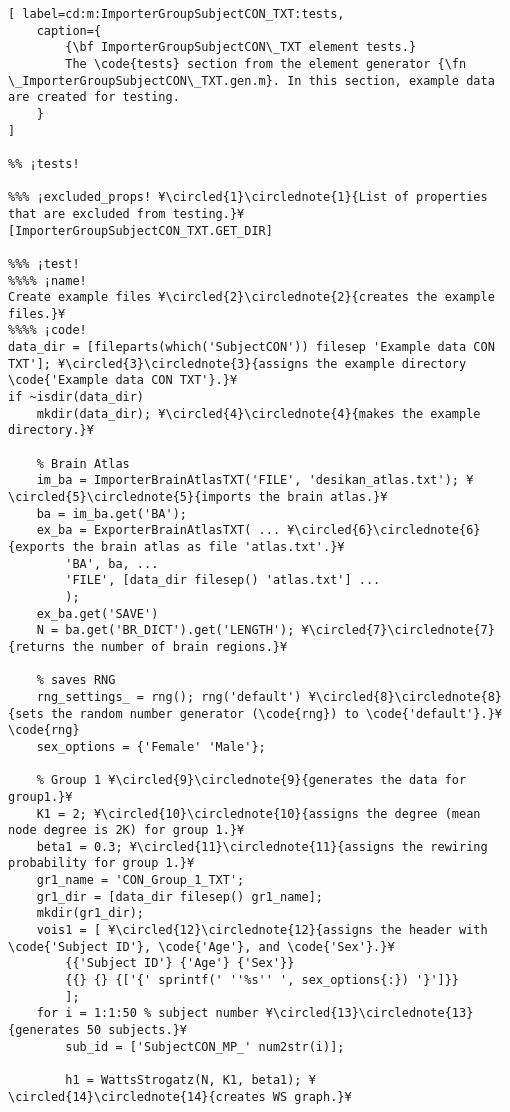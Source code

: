 \documentclass{tufte-handout}
\begin{document}
\begin{lstlisting}[	label=cd:m:ImporterGroupSubjectCON_TXT:tests,
	caption={
		{\bf ImporterGroupSubjectCON\_TXT element tests.}
		The \code{tests} section from the element generator {\fn \_ImporterGroupSubjectCON\_TXT.gen.m}. In this section, example data are created for testing.
	}
]

%% ¡tests!

%%% ¡excluded_props! ¥\circled{1}\circlednote{1}{List of properties that are excluded from testing.}¥
[ImporterGroupSubjectCON_TXT.GET_DIR]

%%% ¡test!
%%%% ¡name!
Create example files ¥\circled{2}\circlednote{2}{creates the example files.}¥
%%%% ¡code!
data_dir = [fileparts(which('SubjectCON')) filesep 'Example data CON TXT']; ¥\circled{3}\circlednote{3}{assigns the example directory \code{'Example data CON TXT'}.}¥
if ~isdir(data_dir)
    mkdir(data_dir); ¥\circled{4}\circlednote{4}{makes the example directory.}¥

    % Brain Atlas
    im_ba = ImporterBrainAtlasTXT('FILE', 'desikan_atlas.txt'); ¥\circled{5}\circlednote{5}{imports the brain atlas.}¥
    ba = im_ba.get('BA');
    ex_ba = ExporterBrainAtlasTXT( ... ¥\circled{6}\circlednote{6}{exports the brain atlas as file 'atlas.txt'.}¥
        'BA', ba, ...
        'FILE', [data_dir filesep() 'atlas.txt'] ...
        );
    ex_ba.get('SAVE')
    N = ba.get('BR_DICT').get('LENGTH'); ¥\circled{7}\circlednote{7}{returns the number of brain regions.}¥

    % saves RNG
    rng_settings_ = rng(); rng('default') ¥\circled{8}\circlednote{8}{sets the random number generator (\code{rng}) to \code{'default'}.}¥
\code{rng}
    sex_options = {'Female' 'Male'};

    % Group 1 ¥\circled{9}\circlednote{9}{generates the data for group1.}¥
    K1 = 2; ¥\circled{10}\circlednote{10}{assigns the degree (mean node degree is 2K) for group 1.}¥
    beta1 = 0.3; ¥\circled{11}\circlednote{11}{assigns the rewiring probability for group 1.}¥
    gr1_name = 'CON_Group_1_TXT';
    gr1_dir = [data_dir filesep() gr1_name];
    mkdir(gr1_dir);
    vois1 = [ ¥\circled{12}\circlednote{12}{assigns the header with \code{'Subject ID'}, \code{'Age'}, and \code{'Sex'}.}¥
        {{'Subject ID'} {'Age'} {'Sex'}}
        {{} {} {['{' sprintf(' ''%s'' ', sex_options{:}) '}']}}
        ];
    for i = 1:1:50 % subject number ¥\circled{13}\circlednote{13}{generates 50 subjects.}¥
        sub_id = ['SubjectCON_MP_' num2str(i)];

        h1 = WattsStrogatz(N, K1, beta1); ¥\circled{14}\circlednote{14}{creates WS graph.}¥  


\end{lstlisting}
\end{document}
